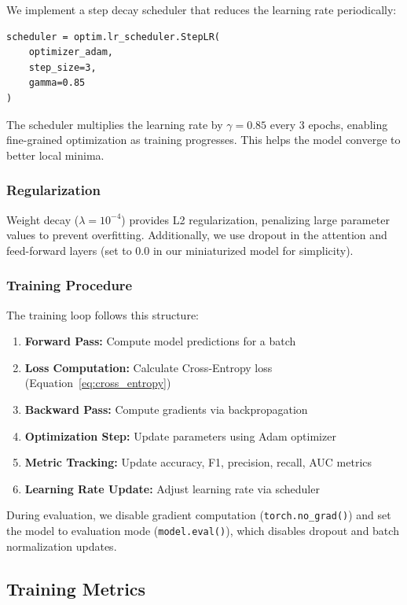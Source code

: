 \documentclass{article}
\begin{document}
We implement a step decay scheduler that reduces the learning rate periodically:

\begin{lstlisting}[caption={Learning Rate Scheduler}]
scheduler = optim.lr_scheduler.StepLR(
    optimizer_adam, 
    step_size=3,
    gamma=0.85
)
\end{lstlisting}

The scheduler multiplies the learning rate by $\gamma=0.85$ every 3 epochs, enabling fine-grained optimization as training progresses. This helps the model converge to better local minima.

\subsubsection{Regularization}

Weight decay ($\lambda = 10^{-4}$) provides L2 regularization, penalizing large parameter values to prevent overfitting. Additionally, we use dropout in the attention and feed-forward layers (set to 0.0 in our miniaturized model for simplicity).

\subsubsection{Training Procedure}

The training loop follows this structure:

\begin{enumerate}
    \item \textbf{Forward Pass:} Compute model predictions for a batch
    \item \textbf{Loss Computation:} Calculate Cross-Entropy loss (Equation~\ref{eq:cross_entropy})
    \item \textbf{Backward Pass:} Compute gradients via backpropagation
    \item \textbf{Optimization Step:} Update parameters using Adam optimizer
    \item \textbf{Metric Tracking:} Update accuracy, F1, precision, recall, AUC metrics
    \item \textbf{Learning Rate Update:} Adjust learning rate via scheduler
\end{enumerate}

During evaluation, we disable gradient computation (\texttt{torch.no\_grad()}) and set the model to evaluation mode (\texttt{model.eval()}), which disables dropout and batch normalization updates.

\subsection{Training Metrics}
\end{document}
